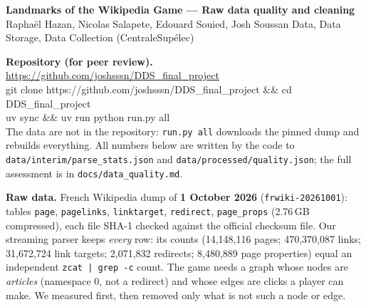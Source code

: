 \documentclass[10pt,a4paper]{article}
\begin{document}
{\large\bfseries Landmarks of the Wikipedia Game --- Raw data quality and cleaning}\\[2pt]
{\small Raphaël Hazan, Nicolas Salapete, Edouard Souied, Josh Soussan \quad
Data, Data Storage, Data Collection (CentraleSupélec)}

\medskip
\textbf{Repository (for peer review).}
\url{https://github.com/joshsssn/DDS_final_project}\\
{\small\ttfamily git clone https://github.com/joshsssn/DDS\_final\_project \&\& cd DDS\_final\_project\\
uv sync \&\& uv run python run.py all}\\
{\small The data are not in the repository: \texttt{run.py all} downloads the pinned dump and rebuilds
everything. All numbers below are written by the code to \texttt{data/interim/parse\_stats.json} and
\texttt{data/processed/quality.json}; the full assessment is in \texttt{docs/data\_quality.md}.}

\medskip
\textbf{Raw data.} French Wikipedia dump of \textbf{1 October 2026} (\texttt{frwiki-20261001}): tables
\texttt{page}, \texttt{pagelinks}, \texttt{linktarget}, \texttt{redirect}, \texttt{page\_props}
(2.76\,GB compressed), each file SHA-1 checked against the official checksum file.
Our streaming parser keeps \emph{every} row: its counts (14,148,116 pages; 470,370,087 links;
31,672,724 link targets; 2,071,832 redirects; 8,480,889 page properties) equal an independent
\texttt{zcat | grep -c} count.
The game needs a graph whose nodes are \emph{articles} (namespace 0, not a redirect) and whose edges
are clicks a player can make. We measured first, then removed only what is not such a node or edge.
\end{document}
